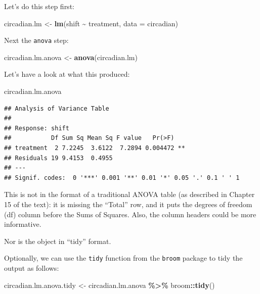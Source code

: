 \documentclass[
]{book}
\newenvironment{Shaded}{\begin{snugshade}}{\end{snugshade}}
\newcommand{\AttributeTok}[1]{\textcolor[rgb]{0.13,0.29,0.53}{#1}}
\newcommand{\FunctionTok}[1]{\textcolor[rgb]{0.13,0.29,0.53}{\textbf{#1}}}
\newcommand{\NormalTok}[1]{#1}
\newcommand{\OtherTok}[1]{\textcolor[rgb]{0.56,0.35,0.01}{#1}}
\newcommand{\SpecialCharTok}[1]{\textcolor[rgb]{0.81,0.36,0.00}{\textbf{#1}}}
\begin{document}
Let's do this step first:

\begin{Shaded}
\begin{Highlighting}[]
\NormalTok{circadian.lm }\OtherTok{\textless{}{-}} \FunctionTok{lm}\NormalTok{(shift }\SpecialCharTok{\textasciitilde{}}\NormalTok{ treatment, }\AttributeTok{data =}\NormalTok{ circadian) }
\end{Highlighting}
\end{Shaded}

Next the \texttt{anova} step:

\begin{Shaded}
\begin{Highlighting}[]
\NormalTok{circadian.lm.anova }\OtherTok{\textless{}{-}} \FunctionTok{anova}\NormalTok{(circadian.lm)}
\end{Highlighting}
\end{Shaded}

Let's have a look at what this produced:

\begin{Shaded}
\begin{Highlighting}[]
\NormalTok{circadian.lm.anova}
\end{Highlighting}
\end{Shaded}

\begin{verbatim}
## Analysis of Variance Table
## 
## Response: shift
##           Df Sum Sq Mean Sq F value   Pr(>F)   
## treatment  2 7.2245  3.6122  7.2894 0.004472 **
## Residuals 19 9.4153  0.4955                    
## ---
## Signif. codes:  0 '***' 0.001 '**' 0.01 '*' 0.05 '.' 0.1 ' ' 1
\end{verbatim}

This is not in the format of a traditional ANOVA table (as described in Chapter 15 of the text): it is missing the ``Total'' row, and it puts the degrees of freedom (df) column before the Sums of Squares. Also, the column headers could be more informative.

Nor is the object in ``tidy'' format.

Optionally, we can use the \texttt{tidy} function from the \texttt{broom} package to tidy the output as follows:

\begin{Shaded}
\begin{Highlighting}[]
\NormalTok{circadian.lm.anova.tidy }\OtherTok{\textless{}{-}}\NormalTok{ circadian.lm.anova }\SpecialCharTok{\%\textgreater{}\%}
\NormalTok{  broom}\SpecialCharTok{::}\FunctionTok{tidy}\NormalTok{()}
\end{Highlighting}
\end{Shaded}
\end{document}
